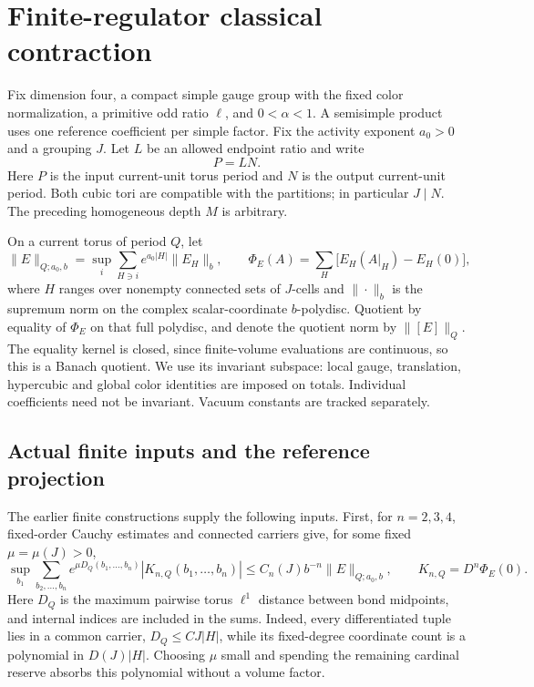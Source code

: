 \documentclass[11pt]{article}
\theoremstyle{remark}
\begin{document}
\section{Finite-regulator classical contraction}
\label{fcc-section}

Fix dimension four, a compact simple gauge group with the fixed
color normalization, a primitive odd ratio \(\ell\), and
\(0<\alpha<1\). A semisimple product uses one reference coefficient
per simple factor. Fix the activity exponent \(a_0>0\) and a
grouping \(J\). Let \(L\) be an allowed endpoint ratio and write
\begin{equation}
 P=LN.
 \label{fcc-periods}
\end{equation}
Here \(P\) is the input current-unit torus period and \(N\) is
the output current-unit period. Both cubic tori are compatible
with the partitions; in particular \(J\mid N\). The preceding
homogeneous depth \(M\) is arbitrary.

On a current torus of period \(Q\), let
\begin{equation}
 \|E\|_{Q;a_0,b}
   =\sup_i\sum_{H\ni i}e^{a_0|H|}\|E_H\|_b,
 \qquad
 \Phi_E(A)=\sum_H\bigl[E_H(A|_H)-E_H(0)\bigr],
 \label{fcc-norm-total}
\end{equation}
where \(H\) ranges over nonempty connected sets of \(J\)-cells
and \(\|\cdot\|_b\) is the supremum norm on the complex
scalar-coordinate \(b\)-polydisc. Quotient by equality of
\(\Phi_E\) on that full polydisc, and denote the quotient norm by
\(\|[E]\|_Q\). The equality kernel is closed, since finite-volume
evaluations are continuous, so this is a Banach quotient.
We use its invariant subspace: local gauge, translation,
hypercubic and global color identities are imposed on totals.
Individual coefficients need not be invariant. Vacuum constants
are tracked separately.

\subsection{Actual finite inputs and the reference projection}
\label{fcc-inputs}

The earlier finite constructions supply the following inputs.
First, for \(n=2,3,4\), fixed-order Cauchy estimates and connected
carriers give, for some fixed \(\mu=\mu(J)>0\),
\begin{equation}
 \sup_{b_1}\sum_{b_2,\ldots,b_n}
 e^{\mu D_Q(b_1,\ldots,b_n)}
 |K_{n,Q}(b_1,\ldots,b_n)|
 \le C_n(J)b^{-n}\|E\|_{Q;a_0,b},
 \qquad K_{n,Q}=D^n\Phi_E(0).
 \label{fcc-kernel-bound}
\end{equation}
Here \(D_Q\) is the maximum pairwise torus \(\ell^1\) distance
between bond midpoints, and internal indices are included in
the sums. Indeed, every differentiated tuple lies in a common
carrier, \(D_Q\le C J|H|\), while its fixed-degree coordinate
count is a polynomial in \(D(J)|H|\). Choosing \(\mu\) small
and spending the remaining cardinal reserve absorbs this
polynomial without a volume factor.
\end{document}
